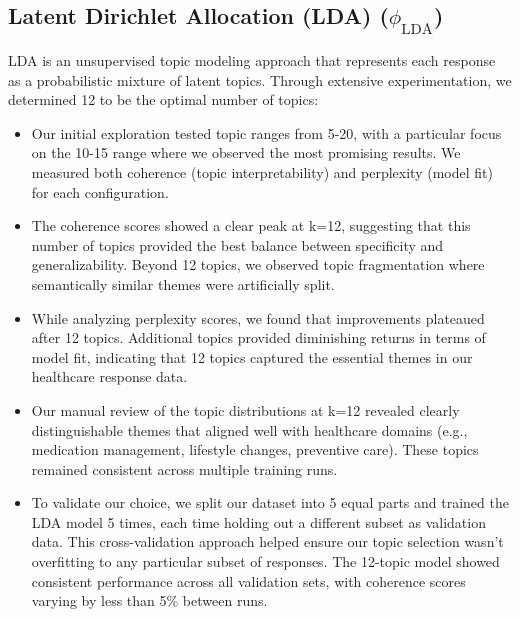 \documentclass{article}
\begin{document}
\subsection{Latent Dirichlet Allocation (LDA) ($\phi_{\text{LDA}}$)}
LDA is an unsupervised topic modeling approach that represents each response as a probabilistic mixture of latent topics. Through extensive experimentation, we determined 12 to be the optimal number of topics:

\begin{itemize}
    \item Our initial exploration tested topic ranges from 5-20, with a particular focus on the 10-15 range where we observed the most promising results. We measured both coherence (topic interpretability) and perplexity (model fit) for each configuration.
    
    \item The coherence scores showed a clear peak at k=12, suggesting that this number of topics provided the best balance between specificity and generalizability. Beyond 12 topics, we observed topic fragmentation where semantically similar themes were artificially split.
    
    \item While analyzing perplexity scores, we found that improvements plateaued after 12 topics. Additional topics provided diminishing returns in terms of model fit, indicating that 12 topics captured the essential themes in our healthcare response data.
    
    \item Our manual review of the topic distributions at k=12 revealed clearly distinguishable themes that aligned well with healthcare domains (e.g., medication management, lifestyle changes, preventive care). These topics remained consistent across multiple training runs.
    
    \item To validate our choice, we split our dataset into 5 equal parts and trained the LDA model 5 times, each time holding out a different subset as validation data. This cross-validation approach helped ensure our topic selection wasn't overfitting to any particular subset of responses. The 12-topic model showed consistent performance across all validation sets, with coherence scores varying by less than 5\% between runs.
\end{itemize}
\end{document}
